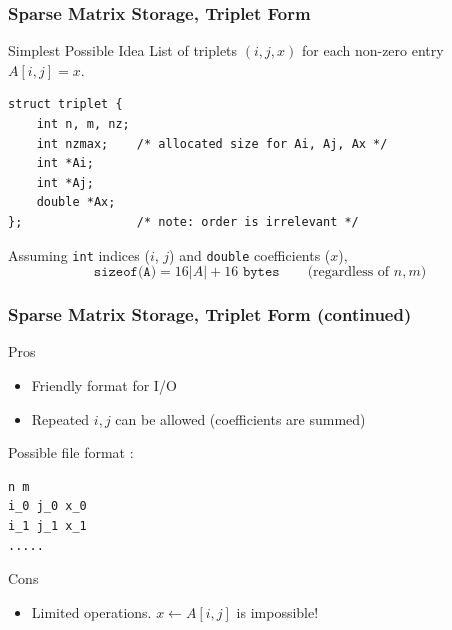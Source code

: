 \documentclass[xcolor={rgb,x11names,svgnames},rgb,x11names,svgnames]{beamer}
\begin{document}

\begin{frame}[fragile=singleslide]
\frametitle{Sparse Matrix Storage, Triplet Form}

\begin{exampleblock}{Simplest Possible Idea}
  List of triplets $(i, j, x)$ for each non-zero entry $A[i,j] = x$.
  
\begin{verbatim}
struct triplet {
    int n, m, nz;
    int nzmax;    /* allocated size for Ai, Aj, Ax */
    int *Ai;
    int *Aj;
    double *Ax;
};                /* note: order is irrelevant */
\end{verbatim}
\end{exampleblock}

\medskip

Assuming \texttt{int} indices ($i$, $j$) and \texttt{double} coefficients ($x$),
\[
\texttt{sizeof(A)} =  16 |A| + 16 \texttt{ bytes} \qquad\text{(regardless of $n, m$)}
\]

\end{frame}


\begin{frame}[fragile=singleslide]
\frametitle{Sparse Matrix Storage, Triplet Form (continued)}

\begin{block}{Pros}
  \begin{itemize}
  \item Friendly format for I/O
  \item Repeated $i,j$ can be allowed (coefficients are summed)
  \end{itemize}
\end{block}

Possible file format :
\begin{verbatim}
n m
i_0 j_0 x_0
i_1 j_1 x_1
.....
\end{verbatim}


\begin{alertblock}{Cons}
  \begin{itemize}
  \item Limited operations. $x \gets A[i,j]$ is impossible!
  \end{itemize}
\end{alertblock}
\end{frame}

\end{document}

